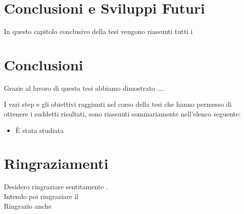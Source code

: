 \chapter{Conclusioni e Sviluppi Futuri}
\minitoc
\textsf{In questo capitolo conclusivo della tesi vengono riassunti tutti i }



\chapter*{Conclusioni}
Grazie al lavoro di questa tesi abbiamo dimostrato ....

I vari step e gli obiettivi raggiunti nel corso della tesi che hanno permesso di ottenere i suddetti risultati, sono riassunti sommariamente nell'elenco seguente:
\begin{itemize}
\item \`E stata studiata 
\end{itemize}



\chapter*{Ringraziamenti}
\pagestyle{plain}
Desidero ringraziare sentitamente .\\

\noindent Intendo poi ringraziare il\\

\noindent Ringrazio anche \\































